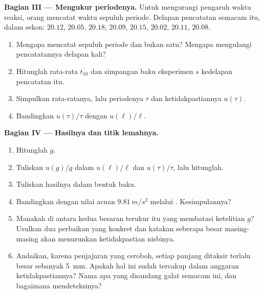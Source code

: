 \begin{problem}
\medskip
\noindent\textbf{Bagian III --- Mengukur periodenya.}
Untuk mengurangi pengaruh waktu reaksi, orang mencatat waktu sepuluh
periode. Delapan pencatatan semacam itu, dalam sekon: $20.12$, $20.05$,
$20.18$, $20.09$, $20.15$, $20.02$, $20.11$, $20.08$.
\begin{enumerate}[resume]
  \item Mengapa mencatat sepuluh periode dan bukan satu? Mengapa
        mengulangi pencatatannya delapan kali?
  \item Hitunglah rata-rata $\overline{t_{10}}$ dan simpangan baku
        eksperimen $s$ kedelapan pencatatan itu.
  \item Simpulkan  rata-ratanya, lalu periodenya
        $\tau$ dan ketidakpastiannya $u(\tau)$.
  \item Bandingkan $u(\tau)/\tau$ dengan $u(\ell)/\ell$.
\end{enumerate}

\medskip
\noindent\textbf{Bagian IV --- Hasilnya dan titik lemahnya.}
\begin{enumerate}[resume]
  \item Hitunglah $g$.
  \item Tuliskan $u(g)/g$ dalam $u(\ell)/\ell$ dan $u(\tau)/\tau$, lalu
        hitunglah.
  \item Tuliskan hasilnya dalam bentuk baku.
  \item Bandingkan dengan nilai acuan $\qty{9.81}{m/s^2}$ melalui
        . Kesimpulannya?
  \item Manakah di antara kedua besaran terukur itu yang membatasi
        ketelitian $g$? Usulkan dua perbaikan yang konkret dan katakan
        seberapa besar masing-masing akan menurunkan ketidakpastian
        nisbinya.
  \item Andaikan, karena penjajaran yang ceroboh, setiap panjang
        ditaksir terlalu besar sebanyak \qty{5}{mm}. Apakah hal ini
        sudah tercakup dalam anggaran ketidakpastiannya? Nama apa yang
        disandang galat semacam ini, dan bagaimana mendeteksinya?
\end{enumerate}


\end{problem}
